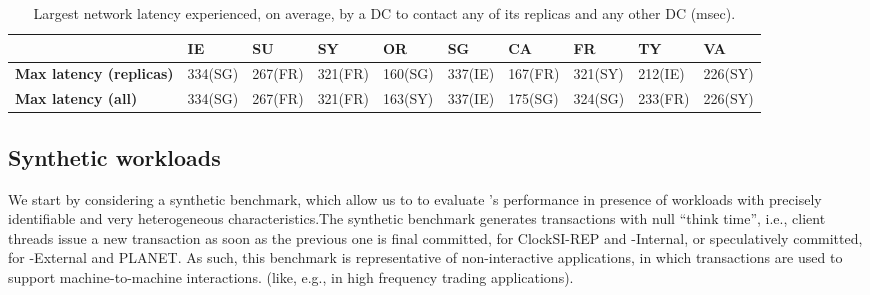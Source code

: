 
\begin{table}
\small
\begin{center}
  \begin{tabular}{l |  l | l | l| l | l | l| l| l |l } 
     & IE & SU& SY& OR & SG & CA &  FR & TY & VA  \\ \hline
  \textbf{Max latency (replicas)} & 334(SG) & 267(FR) & 321(FR) & 160(SG)  & 337(IE) & 167(FR) & 321(SY)& 212(IE)  &  226(SY)  \\   \hline
  \textbf{Max latency (all)} &  334(SG) &  267(FR) & 321(FR)  & 163(SY) & 337(IE) & 175(SG) & 324(SG)  & 233(FR)  & 226(SY) \\ \hline
  \end{tabular}
\end{center}
\caption{Largest network latency experienced, on average, by a DC to contact any of its  replicas and any other DC (msec).}
\label{tab:latency}
\end{table}

\subsection{Synthetic workloads}
We start by considering a synthetic benchmark, which allow us to to evaluate \specula's performance in presence of workloads with precisely identifiable and very heterogeneous characteristics.The synthetic benchmark generates transactions with null ``think time'', i.e., client threads issue a new transaction as soon as the previous one is final committed, for ClockSI-REP and {\specula}-Internal, or speculatively committed, for {\specula}-External and PLANET. As such, this benchmark is representative of non-interactive applications, in which transactions are used to support machine-to-machine interactions. (like, e.g., in high frequency trading applications).


